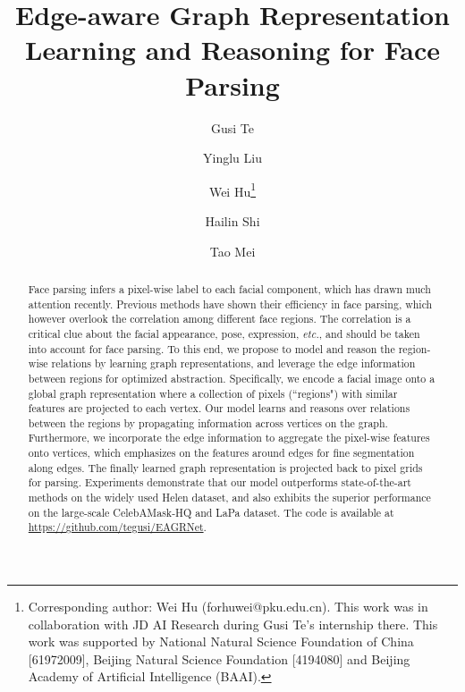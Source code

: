 \documentclass[runningheads]{llncs}
\begin{document}
\pagestyle{headings}
\mainmatter
\def\ECCV20SubNumber{1543}  

\title{Edge-aware Graph Representation Learning and Reasoning for Face Parsing} 







\author{Gusi Te \and
Yinglu Liu \and
Wei Hu\thanks{Corresponding author: Wei Hu (forhuwei@pku.edu.cn). This work was in collaboration with JD AI Research during Gusi Te's internship there. This work was supported by National Natural Science Foundation of China [61972009], Beijing Natural Science Foundation [4194080] and Beijing Academy of Artificial Intelligence (BAAI). } \and
Hailin Shi \and
Tao Mei}





\maketitle

\begin{abstract}
Face parsing infers a pixel-wise label to each facial component, which has drawn much attention recently. 
Previous methods have shown their efficiency in face parsing, which however overlook the correlation among different face regions. 
The correlation is a critical clue about the facial appearance, pose, expression, \textit{etc.}, and should be taken into account for face parsing.
To this end, we propose to model and reason the region-wise relations by learning graph representations, and leverage the edge information between regions for optimized abstraction.     
Specifically, we encode a facial image onto a global graph representation where a collection of pixels (``regions") with similar features are projected to each vertex.
Our model learns and reasons over relations between the regions by propagating information across vertices on the graph. 
Furthermore, we incorporate the edge information to aggregate the pixel-wise features onto vertices, which emphasizes on the features around edges for fine segmentation along edges. 
The finally learned graph representation is projected back to pixel grids for parsing.  
Experiments demonstrate that our model outperforms state-of-the-art methods on the widely used Helen dataset, and also exhibits the superior performance on the large-scale CelebAMask-HQ and LaPa dataset. The code is available at \href{https://github.com/tegusi/EAGRNet}{https://github.com/tegusi/EAGRNet}.

\end{abstract}
\end{document}
